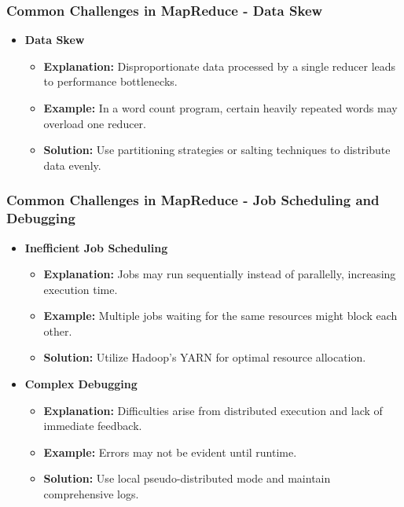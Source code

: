 \documentclass[aspectratio=169]{beamer}
\begin{document}
\begin{frame}[fragile]
    \frametitle{Common Challenges in MapReduce - Data Skew}
    \begin{itemize}
        \item \textbf{Data Skew}
        \begin{itemize}
            \item \textbf{Explanation:} Disproportionate data processed by a single reducer leads to performance bottlenecks.
            \item \textbf{Example:} In a word count program, certain heavily repeated words may overload one reducer.
            \item \textbf{Solution:} Use partitioning strategies or salting techniques to distribute data evenly.
        \end{itemize}
    \end{itemize}
\end{frame}

\begin{frame}[fragile]
    \frametitle{Common Challenges in MapReduce - Job Scheduling and Debugging}
    \begin{itemize}
        \item \textbf{Inefficient Job Scheduling}
        \begin{itemize}
            \item \textbf{Explanation:} Jobs may run sequentially instead of parallelly, increasing execution time.
            \item \textbf{Example:} Multiple jobs waiting for the same resources might block each other.
            \item \textbf{Solution:} Utilize Hadoop's YARN for optimal resource allocation.
        \end{itemize}
        
        \item \textbf{Complex Debugging}
        \begin{itemize}
            \item \textbf{Explanation:} Difficulties arise from distributed execution and lack of immediate feedback.
            \item \textbf{Example:} Errors may not be evident until runtime.
            \item \textbf{Solution:} Use local pseudo-distributed mode and maintain comprehensive logs.
        \end{itemize}
    \end{itemize}
\end{frame}
\end{document}
